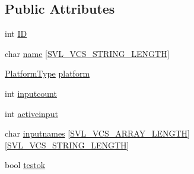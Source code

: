\subsection*{Public Attributes}
\begin{DoxyCompactItemize}
\item 
int \hyperlink{classsvl_filter_source_video_capture_types_1_1_device_info_aaccc76356ec4856b0c32a2f39b273d91}{I\-D}
\item 
char \hyperlink{classsvl_filter_source_video_capture_types_1_1_device_info_ac561061543ebd968e2146173a06f43b2}{name} \mbox{[}\hyperlink{svl_definitions_8h_a37636885d94297a4d13180603ffd78aa}{S\-V\-L\-\_\-\-V\-C\-S\-\_\-\-S\-T\-R\-I\-N\-G\-\_\-\-L\-E\-N\-G\-T\-H}\mbox{]}
\item 
\hyperlink{namespacesvl_filter_source_video_capture_types_aa8ef2b6d9a414a8970cc722eaa37b32b}{Platform\-Type} \hyperlink{classsvl_filter_source_video_capture_types_1_1_device_info_a3ca50fbf0a92a94e6ec84d2c93f2bd31}{platform}
\item 
int \hyperlink{classsvl_filter_source_video_capture_types_1_1_device_info_ac9f5e91e2ceaaf2498f798782ca5ef1a}{inputcount}
\item 
int \hyperlink{classsvl_filter_source_video_capture_types_1_1_device_info_a85dd2a48ada88c84d81110709569b5d3}{activeinput}
\item 
char \hyperlink{classsvl_filter_source_video_capture_types_1_1_device_info_a23dde9ba710beb1adf9c1c12ecd85a9a}{inputnames} \mbox{[}\hyperlink{svl_definitions_8h_adc480737980c8fdc43de655dfd4f796f}{S\-V\-L\-\_\-\-V\-C\-S\-\_\-\-A\-R\-R\-A\-Y\-\_\-\-L\-E\-N\-G\-T\-H}\mbox{]}\mbox{[}\hyperlink{svl_definitions_8h_a37636885d94297a4d13180603ffd78aa}{S\-V\-L\-\_\-\-V\-C\-S\-\_\-\-S\-T\-R\-I\-N\-G\-\_\-\-L\-E\-N\-G\-T\-H}\mbox{]}
\item 
bool \hyperlink{classsvl_filter_source_video_capture_types_1_1_device_info_a1ccd6cfa9057071df17b79bac2624c23}{testok}
\end{DoxyCompactItemize}


